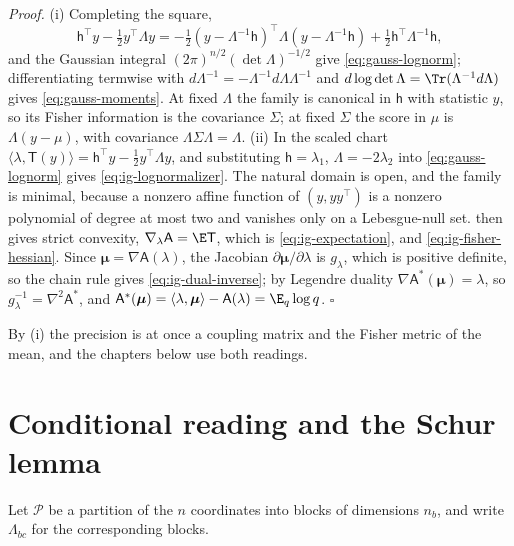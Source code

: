 \noindent\emph{Proof.}
(i) Completing the square,
\begin{equation}
\mathsf h^\top y-\tfrac12 y^\top\Lambda y
=-\tfrac12\left(y-\Lambda^{-1}\mathsf h\right)^\top\Lambda\left(y-\Lambda^{-1}\mathsf h\right)
+\tfrac12\mathsf h^\top\Lambda^{-1}\mathsf h,
\label{eq:gauss-complete-square}
\end{equation}
and the Gaussian integral \((2\pi)^{n/2}(\det\Lambda)^{-1/2}\) give
\eqref{eq:gauss-lognorm}; differentiating termwise with
\(d\Lambda^{-1}=-\Lambda^{-1}d\Lambda\Lambda^{-1}\) and
\(d\log\det\Lambda=\Tr(\Lambda^{-1}d\Lambda)\) gives \eqref{eq:gauss-moments}.
At fixed \(\Lambda\) the family is canonical in \(\mathsf h\) with statistic
\(y\), so its Fisher information is the covariance \(\Sigma\); at fixed
\(\Sigma\) the score in \(\mu\) is \(\Lambda(y-\mu)\), with covariance
\(\Lambda\Sigma\Lambda=\Lambda\). (ii) In the scaled chart \(\langle\lambda,\mathsf T(y)\rangle
=\mathsf h^\top y-\tfrac12y^\top\Lambda y\), and substituting
\(\mathsf h=\lambda_1\), \(\Lambda=-2\lambda_2\) into \eqref{eq:gauss-lognorm}
gives \eqref{eq:ig-lognormalizer}. The natural domain is open, and the family
is minimal, because a nonzero affine function of \((y,yy^\top)\) is a nonzero
polynomial of degree at most two and vanishes only on a Lebesgue-null set.
 then gives strict convexity,
\(\nabla_\lambda\mathsf A=\E\mathsf T\), which is \eqref{eq:ig-expectation},
and \eqref{eq:ig-fisher-hessian}. Since
\(\boldsymbol\mu=\nabla\mathsf A(\lambda)\), the Jacobian
\(\partial\boldsymbol\mu/\partial\lambda\) is \(g_\lambda\), which is positive
definite, so the chain rule gives \eqref{eq:ig-dual-inverse}; by Legendre
duality \(\nabla\mathsf A^\ast(\boldsymbol\mu)=\lambda\), so
\(g_\lambda^{-1}=\nabla^2\mathsf A^\ast\), and
\(\mathsf A^\ast(\boldsymbol\mu)=\langle\lambda,\boldsymbol\mu\rangle-\mathsf A(\lambda)
=\E_q\log q\). \(\square\)

By (i) the precision is at once a coupling matrix and the Fisher metric of
the mean, and the chapters below use both readings.

\section{Conditional reading and the Schur lemma}
\label{sec:gauss-conditional-reading}

Let \(\mathcal P\) be a partition of the \(n\) coordinates into blocks of
dimensions \(n_b\), and write \(\Lambda_{bc}\) for the corresponding blocks.


